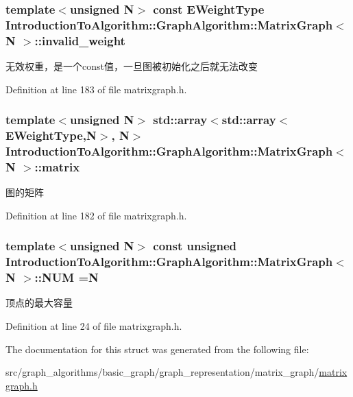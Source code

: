 \subsubsection[{invalid\+\_\+weight}]{\setlength{\rightskip}{0pt plus 5cm}template$<$unsigned N$>$ const {\bf E\+Weight\+Type} {\bf Introduction\+To\+Algorithm\+::\+Graph\+Algorithm\+::\+Matrix\+Graph}$<$ N $>$\+::invalid\+\_\+weight}\label{struct_introduction_to_algorithm_1_1_graph_algorithm_1_1_matrix_graph_accc79376e509d7ffa016ef5003512976}
无效权重，是一个const值，一旦图被初始化之后就无法改变 

Definition at line 183 of file matrixgraph.\+h.

\hypertarget{struct_introduction_to_algorithm_1_1_graph_algorithm_1_1_matrix_graph_ae1febbc0e4a86c325a16a942947a03bf}{}
\subsubsection[{matrix}]{\setlength{\rightskip}{0pt plus 5cm}template$<$unsigned N$>$ std\+::array$<$std\+::array$<${\bf E\+Weight\+Type},N$>$, N$>$ {\bf Introduction\+To\+Algorithm\+::\+Graph\+Algorithm\+::\+Matrix\+Graph}$<$ N $>$\+::matrix}\label{struct_introduction_to_algorithm_1_1_graph_algorithm_1_1_matrix_graph_ae1febbc0e4a86c325a16a942947a03bf}
图的矩阵 

Definition at line 182 of file matrixgraph.\+h.

\hypertarget{struct_introduction_to_algorithm_1_1_graph_algorithm_1_1_matrix_graph_a68d153cb2714464d5c432d667e29f28f}{}
\subsubsection[{N\+U\+M}]{\setlength{\rightskip}{0pt plus 5cm}template$<$unsigned N$>$ const unsigned {\bf Introduction\+To\+Algorithm\+::\+Graph\+Algorithm\+::\+Matrix\+Graph}$<$ N $>$\+::N\+U\+M =N\hspace{0.3cm}{\ttfamily [static]}}\label{struct_introduction_to_algorithm_1_1_graph_algorithm_1_1_matrix_graph_a68d153cb2714464d5c432d667e29f28f}
顶点的最大容量 

Definition at line 24 of file matrixgraph.\+h.



The documentation for this struct was generated from the following file\+:\begin{DoxyCompactItemize}
\item 
src/graph\+\_\+algorithms/basic\+\_\+graph/graph\+\_\+representation/matrix\+\_\+graph/\hyperlink{matrixgraph_8h}{matrixgraph.\+h}\end{DoxyCompactItemize}
